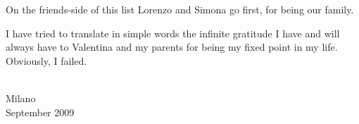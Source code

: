On the friends-side of this list Lorenzo and Simona go first, for being our family.

I have tried to translate in simple words the infinite gratitude I have and will always have to Valentina and my parents for being my fixed point in my life. Obviously, I failed.

\begin{flushright}
\textsc{\theauthor}\\
Milano\\
September 2009
\end{flushright}

\cleartoverso %

